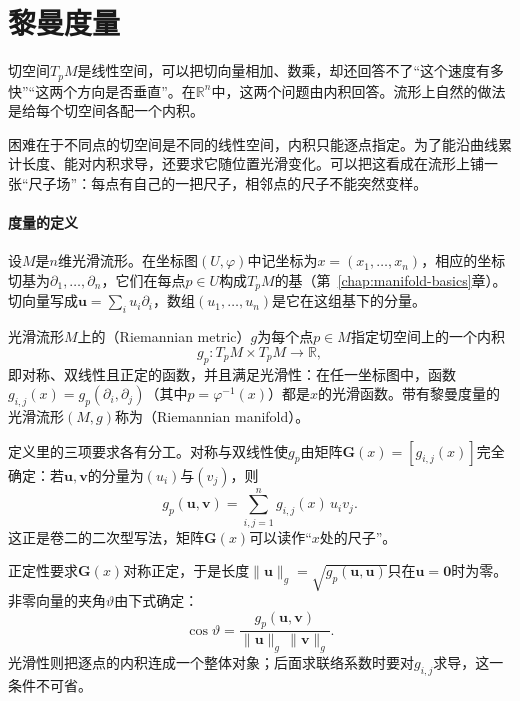 \section{黎曼度量}
\label{sec:riem-metric}

切空间$T_pM$是线性空间，可以把切向量相加、数乘，却还回答不了“这个速度有多快”“这两个方向是否垂直”。在$\mathbb R^n$中，这两个问题由内积回答。流形上自然的做法是给每个切空间各配一个内积。

困难在于不同点的切空间是不同的线性空间，内积只能逐点指定。为了能沿曲线累计长度、能对内积求导，还要求它随位置光滑变化。可以把这看成在流形上铺一张“尺子场”：每点有自己的一把尺子，相邻点的尺子不能突然变样。

\paragraph{度量的定义}
设$M$是$n$维光滑流形。在坐标图$(U,\varphi)$中记坐标为$x=(x_1,\ldots,x_n)$，相应的坐标切基为$\partial_1,\ldots,\partial_n$，它们在每点$p\in U$构成$T_pM$的基（第~\ref{chap:manifold-basics}章）。切向量写成$\bm u=\sum_iu_i\partial_i$，数组$(u_1,\ldots,u_n)$是它在这组基下的分量。

\begin{definition}[黎曼度量]
\label{def:riem-metric}
光滑流形$M$上的（Riemannian metric）$g$为每个点$p\in M$指定切空间上的一个内积
\begin{equation}
g_p:T_pM\times T_pM\to\mathbb R,
\label{eq:riem-metric-pointwise}
\end{equation}
即对称、双线性且正定的函数，并且满足光滑性：在任一坐标图中，函数$g_{i,j}(x)=g_p(\partial_i,\partial_j)$（其中$p=\varphi^{-1}(x)$）都是$x$的光滑函数。带有黎曼度量的光滑流形$(M,g)$称为（Riemannian manifold）。
\end{definition}

定义里的三项要求各有分工。对称与双线性使$g_p$由矩阵$\bm G(x)=[g_{i,j}(x)]$完全确定：若$\bm u,\bm v$的分量为$(u_i)$与$(v_j)$，则
\begin{equation}
g_p(\bm u,\bm v)=\sum_{i,j=1}^n g_{i,j}(x)\,u_iv_j .
\label{eq:riem-metric-coordinates}
\end{equation}
这正是卷二的二次型写法，矩阵$\bm G(x)$可以读作“$x$处的尺子”。

正定性要求$\bm G(x)$对称正定，于是长度$\lVert\bm u\rVert_g=\sqrt{g_p(\bm u,\bm u)}$只在$\bm u=\bm 0$时为零。非零向量的夹角$\vartheta$由下式确定：
\[
\cos\vartheta=\frac{g_p(\bm u,\bm v)}{\lVert\bm u\rVert_g\,\lVert\bm v\rVert_g}.
\]
光滑性则把逐点的内积连成一个整体对象；后面求联络系数时要对$g_{i,j}$求导，这一条件不可省。

